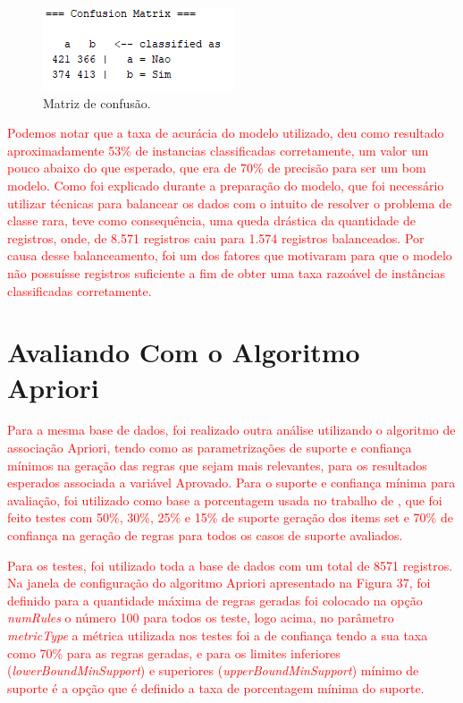 \par
\begin{figure}[!htp]
	\begin{center}
    \caption{\label{fig:waveform_fig} Matriz de confusão.}
	\includegraphics[scale=0.99]{Figuras/Matriz_de_classificacao.png}
	\end{center}
\end{figure}

\par
\textcolor{red}{Podemos notar que a taxa de acurácia do modelo utilizado, deu como resultado aproximadamente 53\% de instancias classificadas corretamente, um valor um pouco abaixo do que esperado, que era de 70\% de precisão para ser um bom modelo. Como foi explicado durante a preparação do modelo, que foi necessário utilizar técnicas para balancear os dados com o intuito de resolver o problema de classe rara, teve como consequência, uma queda drástica da quantidade de registros, onde, de 8.571 registros caiu para 1.574 registros balanceados. Por causa desse balanceamento, foi um dos fatores que motivaram para que o modelo não possuísse registros suficiente a fim de obter uma taxa razoável  de instâncias classificadas corretamente.}



\section{Avaliando Com o Algoritmo Apriori}


\textcolor{red}{Para a mesma base de dados, foi realizado outra análise utilizando o algoritmo de associação Apriori, tendo como as parametrizações de suporte e confiança mínimos na geração das regras que sejam mais relevantes, para os resultados esperados associada a variável Aprovado. Para o suporte e confiança mínima para avaliação, foi utilizado como base a porcentagem usada no trabalho de , que foi feito testes com 50\%, 30\%, 25\% e 15\% de suporte geração dos items set e 70\% de confiança na geração de regras para todos os casos de suporte avaliados.}

\par
\textcolor{red}{Para os testes, foi utilizado toda a base de dados com um total de 8571 registros. Na janela de configuração do algoritmo Apriori apresentado na Figura 37, foi definido para a quantidade máxima de regras geradas foi colocado na opção \textit{numRules} o número 100 para todos os teste, logo acima, no parâmetro \textit{metricType} a métrica utilizada nos testes foi a de confiança tendo a sua taxa como 70\% para as regras geradas, e para os limites inferiores (\textit{lowerBoundMinSupport}) e superiores (\textit{upperBoundMinSupport}) mínimo de suporte é a opção que é definido a taxa de porcentagem mínima do suporte.}


